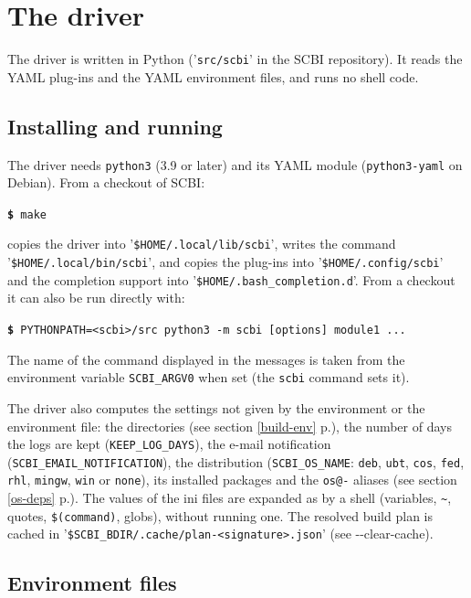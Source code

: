 \documentclass[a4paper,12pt,twoside]{article}
\newcommand{\code}[1]{\texttt{#1}}
\newcommand{\seeref}[1]{see section \ref{#1} p.\pageref{#1}}
\newcommand{\file}[1]{'{\texttt{#1}}'}
\newcommand{\cmd}[1]{\tabto{1cm}\hspace{0.5cm}\texttt{\textbf{\$} #1}}
\let\stdsection\section
\renewcommand\section{\newpage\stdsection}
\newcommand{\ddash}{-{}-}
\begin{document}

\section{The driver}
\label{python-driver}

The driver is written in Python (\file{src/scbi} in the SCBI
repository). It reads the YAML plug-ins and the YAML environment files,
and runs no shell code.

\subsection{Installing and running}

The driver needs \code{python3} (3.9 or later) and its YAML module
(\code{python3-yaml} on Debian). From a checkout of SCBI:

\cmd{make}

copies the driver into \file{\$HOME/.local/lib/scbi}, writes the command
\file{\$HOME/.local/bin/scbi}, and copies the plug-ins into
\file{\$HOME/.config/scbi} and the completion support into
\file{\$HOME/.bash\_completion.d}. From a checkout it can also be run
directly with:

\cmd{PYTHONPATH=<scbi>/src python3 -m scbi [options] module1 ...}

The name of the command displayed in the messages is taken from the
environment variable \code{SCBI\_ARGV0} when set (the \code{scbi}
command sets it).

The driver also computes the settings not given by the environment or the
environment file: the directories (\seeref{build-env}), the number of
days the logs are kept (\code{KEEP\_LOG\_DAYS}), the e-mail notification
(\code{SCBI\_EMAIL\_NOTIFICATION}), the distribution (\code{SCBI\_OS\_NAME}:
\code{deb}, \code{ubt}, \code{cos}, \code{fed}, \code{rhl}, \code{mingw},
\code{win} or \code{none}), its installed packages and the \code{os@-}
aliases (\seeref{os-deps}). The values of the ini files are expanded as by
a shell (variables, \code{\textasciitilde{}}, quotes, \code{\$(command)},
globs), without running one. The resolved build plan is cached in
\file{\$SCBI\_BDIR/.cache/plan-<signature>.json} (see \ddash{}clear-cache).

\subsection{Environment files}
\label{env-files}
\end{document}
